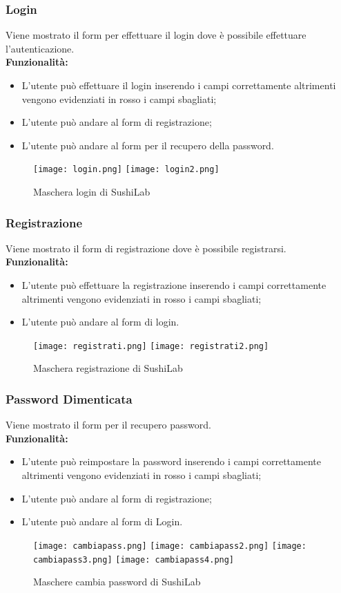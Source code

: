\subsubsection{Login}
Viene mostrato il form per effettuare il login dove è possibile effettuare l'autenticazione.\\
\textbf{Funzionalità:}
\begin{itemize}
    \item L'utente può effettuare il login inserendo i campi correttamente altrimenti vengono evidenziati in rosso i campi sbagliati;
    \item L'utente può andare al form di registrazione;
    \item L'utente può andare al form per il recupero della password.
\end{itemize}
\begin{figure}[H]
    \centering
    \texttt{[image: login.png]}
    \texttt{[image: login2.png]}
    \caption{Maschera login di SushiLab}
\end{figure}
\pagebreak

\subsubsection{Registrazione}
Viene mostrato il form di registrazione dove è possibile registrarsi.\\
\textbf{Funzionalità:}
\begin{itemize}
    \item L'utente può effettuare la registrazione inserendo i campi correttamente altrimenti vengono evidenziati in rosso i campi sbagliati;
    \item L'utente può andare al form di login.
\end{itemize}
\begin{figure}[H]
    \centering
    \texttt{[image: registrati.png]}
    \texttt{[image: registrati2.png]}
    \caption{Maschera registrazione di SushiLab}
\end{figure}
\pagebreak

\subsubsection{Password Dimenticata}
Viene mostrato il form per il recupero password.\\
\textbf{Funzionalità:}
\begin{itemize}
    \setlength\itemsep{.1em}
    \item L'utente può reimpostare la password inserendo i campi correttamente altrimenti vengono evidenziati in rosso i campi sbagliati;
    \item L'utente può andare al form di registrazione;
    \item L'utente può andare al form di Login.
\end{itemize}
\begin{figure}[H]
    \centering
    \texttt{[image: cambiapass.png]}
    \texttt{[image: cambiapass2.png]}
    \texttt{[image: cambiapass3.png]}
    \texttt{[image: cambiapass4.png]}
    \caption{Maschere cambia password di SushiLab}
\end{figure}
\pagebreak

